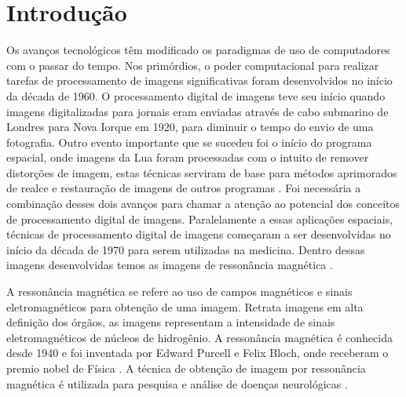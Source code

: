 \documentclass[openright]{UFRGS} %
\begin{document}
\listoffigures

\listoftables


\tableofcontents

\chapter{Introdução}

Os avanços tecnológicos têm modificado os paradigmas de uso de
computadores com o passar do tempo. Nos primórdios, o poder computacional
para realizar tarefas de processamento de imagens significativas foram desenvolvidos no início da década de 1960. O processamento digital de imagens teve seu início  quando
imagens digitalizadas para jornais eram enviadas através de cabo submarino de Londres para Nova Iorque em 1920, para diminuir o tempo do envio de uma fotografia. Outro evento importante  que se  sucedeu foi o início do
programa espacial, onde imagens da Lua foram processadas com o intuito de remover distorções de imagem, estas técnicas serviram de base para métodos aprimorados de realce e restauração de imagens de outros programas \cite{gonzalez2010processamento}. Foi necessária a combinação desses dois avanços para chamar a atenção ao potencial dos conceitos de processamento digital de imagens. Paralelamente a essas aplicações espaciais, técnicas
de processamento digital de imagens começaram a ser desenvolvidas no início da década de 1970 para serem utilizadas na  medicina. Dentro dessas imagens desenvolvidas temos as imagens de ressonância magnética \cite{gonzalez2010processamento}. 


A ressonância magnética se refere ao uso de campos magnéticos e sinais eletromagnéticos para obtenção de uma imagem. Retrata  imagens em alta definição dos órgãos, as imagens representam a intensidade de sinais eletromagnéticos de núcleos de hidrogênio. A ressonância magnética é conhecida desde 1940 e foi inventada por Edward Purcell e Felix Bloch, onde receberam o premio nobel de Física \cite{nacif2011manual}. A técnica de obtenção de imagem por ressonância magnética  é  utilizada para pesquisa e análise de doenças neurológicas \cite{AmaroJunior2001AspectosMagnetica}. 
\end{document}
